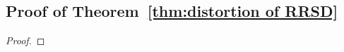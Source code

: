\documentclass[letterpaper,11pt]{article}
\begin{document}
\subsection{Proof of Theorem~\ref{thm:distortion of RRSD}}

\begin{proof}
    
    
    
    

\end{proof}
\end{document}
